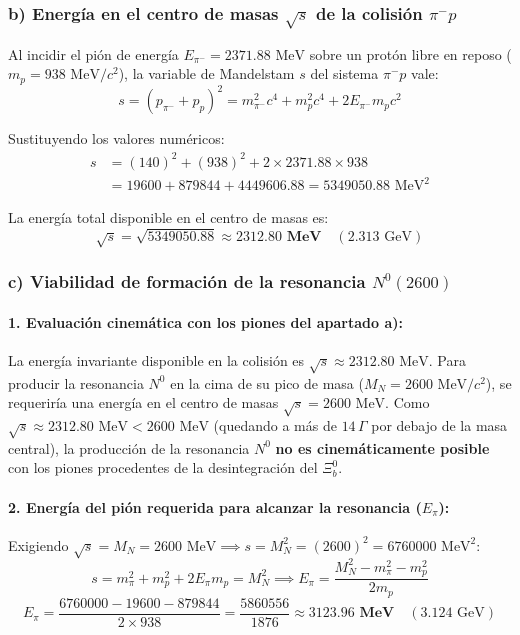 \begin{problema}
\subsubsection*{b) Energía en el centro de masas $\sqrt{s}$ de la colisión $\pi^- p$}

Al incidir el pión de energía $E_{\pi^-} = 2371.88\text{ MeV}$ sobre un protón libre en reposo ($m_p = 938\text{ MeV}/c^2$), la variable de Mandelstam $s$ del sistema $\pi^- p$ vale:
\begin{equation*}
s = (p_{\pi^-} + p_p)^2 = m_{\pi^-}^2 c^4 + m_p^2 c^4 + 2 E_{\pi^-} m_p c^2
\end{equation*}

Sustituyendo los valores numéricos:
\begin{align*}
s &= (140)^2 + (938)^2 + 2 \times 2371.88 \times 938 \\
&= 19600 + 879844 + 4449606.88 = 5349050.88\text{ MeV}^2
\end{align*}

La energía total disponible en el centro de masas es:
\begin{equation*}
\sqrt{s} = \sqrt{5349050.88} \approx \mathbf{2312.80\text{ MeV}} \quad (2.313\text{ GeV})
\end{equation*}

\subsubsection*{c) Viabilidad de formación de la resonancia $N^0(2600)$}

\paragraph{1. Evaluación cinemática con los piones del apartado a):}
La energía invariante disponible en la colisión es $\sqrt{s} \approx 2312.80\text{ MeV}$. Para producir la resonancia $N^0$ en la cima de su pico de masa ($M_N = 2600\text{ MeV}/c^2$), se requeriría una energía en el centro de masas $\sqrt{s} = 2600\text{ MeV}$. Como $\sqrt{s} \approx 2312.80\text{ MeV} < 2600\text{ MeV}$ (quedando a más de $14\,\Gamma$ por debajo de la masa central), la producción de la resonancia $N^0$ \textbf{no es cinemáticamente posible} con los piones procedentes de la desintegración del $\Xi_b^0$.

\paragraph{2. Energía del pión requerida para alcanzar la resonancia ($E_\pi$):}
Exigiendo $\sqrt{s} = M_N = 2600\text{ MeV} \implies s = M_N^2 = (2600)^2 = 6760000\text{ MeV}^2$:
\begin{equation*}
s = m_\pi^2 + m_p^2 + 2 E_\pi m_p = M_N^2 \implies E_\pi = \frac{M_N^2 - m_\pi^2 - m_p^2}{2 m_p}
\end{equation*}
\begin{equation*}
E_\pi = \frac{6760000 - 19600 - 879844}{2 \times 938} = \frac{5860556}{1876} \approx \mathbf{3123.96\text{ MeV}} \quad (3.124\text{ GeV})
\end{equation*}


\end{problema}
